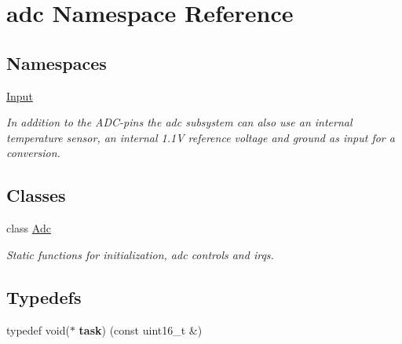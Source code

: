 \hypertarget{namespaceadc}{}\section{adc Namespace Reference}
\label{namespaceadc}
\subsection*{Namespaces}
\begin{DoxyCompactItemize}
\item 
 \hyperlink{namespaceadc_1_1Input}{Input}
\begin{DoxyCompactList}\small\item\em In addition to the A\+D\+C-\/pins the adc subsystem can also use an internal temperature sensor, an internal 1.\+1V reference voltage and ground as input for a conversion. \end{DoxyCompactList}\end{DoxyCompactItemize}
\subsection*{Classes}
\begin{DoxyCompactItemize}
\item 
class \hyperlink{classadc_1_1Adc}{Adc}
\begin{DoxyCompactList}\small\item\em Static functions for initialization, adc controls and irqs. \end{DoxyCompactList}\end{DoxyCompactItemize}
\subsection*{Typedefs}
\begin{DoxyCompactItemize}
\item 
typedef void($\ast$ {\bfseries task}) (const uint16\+\_\+t \&)\hypertarget{namespaceadc_a0e6e6773a0ed848acb0887f1ed3c76ae}{}\label{namespaceadc_a0e6e6773a0ed848acb0887f1ed3c76ae}

\end{DoxyCompactItemize}
